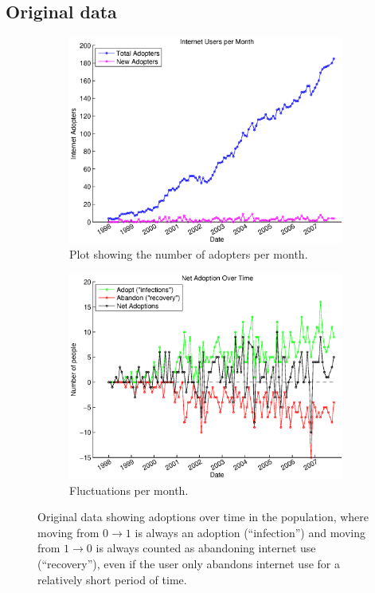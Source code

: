 \documentclass[12pt]{article}
\begin{document}
\subsection{Original data}
\begin{figure}[h]
    \begin{subfigure}[h]{.55\textwidth}
        \centering
        \includegraphics[trim = 2cm 0cm 0cm .5cm, width = .9\textwidth]{Graficos/AdoptersperMonth.eps}
        \caption{Plot showing the number of adopters per month.}%
    \end{subfigure}
    \begin{subfigure}[h]{.55\textwidth}
        \centering
	\includegraphics[trim = 2cm 0cm 0cm .5cm, width = .9\textwidth]{Graficos/trans.eps}
        \caption{Fluctuations per month.}%
    \end{subfigure}
    \caption{Original data showing adoptions over time in the population, where moving from \(0 \rightarrow 1\) is always an adoption (``infection'') and moving from \(1 \rightarrow 0\) is always counted as abandoning internet use (``recovery''), even if the user only abandons internet use for a relatively short period of time.}
\end{figure}
\end{document}
